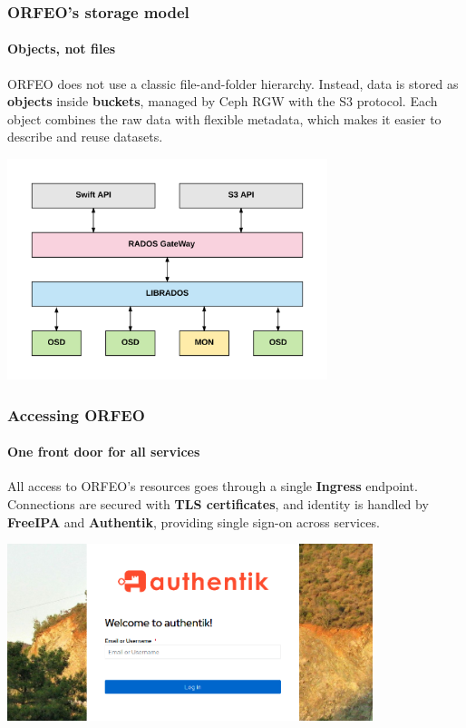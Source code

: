 \documentclass{beamer}
\begin{document}
	\begin{frame}
		\frametitle{ORFEO’s storage model}
		\framesubtitle{Objects, not files}
		
		ORFEO does not use a classic file-and-folder hierarchy.  
		Instead, data is stored as \textbf{objects} inside \textbf{buckets}, managed by Ceph RGW with the S3 protocol.  
		Each object combines the raw data with flexible metadata, which makes it easier to describe and reuse datasets.
		
		\centering
		\includegraphics[width=0.7\textwidth]{otherResources/CEPH_RGW_diagram.png} %
	\end{frame}
		
	\begin{frame}
		\frametitle{Accessing ORFEO}
		\framesubtitle{One front door for all services}
		
		All access to ORFEO’s resources goes through a single \textbf{Ingress} endpoint.  
		Connections are secured with \textbf{TLS certificates}, and identity is handled by  
		\textbf{FreeIPA} and \textbf{Authentik}, providing single sign-on across services.
		
		\vspace{1em}
		\centering
		\includegraphics[width=0.8\textwidth]{otherResources/authentik_login.png} %
	\end{frame}
	
\end{document}
